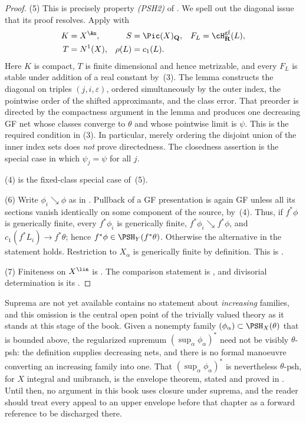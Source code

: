 \begin{proof}
(5) This is precisely property \emph{(PSH2)} of
\cite[Theorem~4.5]{BJ22}.  We spell out the diagonal issue that its proof
resolves.  Apply \cite[Lemma~4.6]{BJ22} with
\[
 \begin{aligned}
  K&=X^{\An},& S&=\Pic(X)_{\mathbf Q},
    &F_L&=\cH^{\mathrm{gf}}_{\mathbf R}(L),\\
  T&=N^1(X),& \rho(L)&=c_1(L).
 \end{aligned}
\]
Here \(K\) is compact, \(T\) is finite dimensional and hence metrizable,
and every \(F_L\) is stable under addition of a real constant by
\,(3).  The lemma constructs the diagonal on
triples \((j,i,\varepsilon)\), ordered simultaneously by the outer index,
the pointwise order of the shifted approximants, and the class error.  That
preorder is directed by the compactness argument in the lemma and produces
one decreasing GF net whose classes converge to \(\theta\) and whose
pointwise limit is \(\psi\).  This is the required condition in
(3).  In particular, merely ordering the disjoint union of
the inner index sets does \emph{not} prove directedness.  The closedness
assertion is the special case in which \(\psi_j=\psi\) for all \(j\).

(4) is the fixed-class special case of~(5).

(6) Write \(\phi_i\searrow\phi\) as in .  Pullback of a
GF presentation is again GF unless all its sections vanish identically on
some component of the source, by \,(4).  Thus,
if \(f^*\phi\) is generically finite, every \(f^*\phi_i\) is generically
finite, \(f^*\phi_i\searrow f^*\phi\), and
\(c_1(f^*L_i)\to f^*\theta\); hence
\(f^*\phi\in\PSH_Y(f^*\theta)\).  Otherwise the alternative in the
statement holds.  Restriction to \(X_\alpha\) is generically finite by
definition.  This is \cite[Theorem~4.7\,(iii)--(iv)]{BJ22}.

(7) Finiteness on \(X^{\lin}\) is
\cite[Corollary~4.17]{BJ22}.  The comparison statement is
\cite[Theorem~4.22]{BJ22}, and divisorial determination is its
\cite[Corollary~4.23]{BJ22}.
\end{proof}

\begin{warning}{Suprema are not yet available}
 contains no statement about \emph{increasing}
families, and this omission is the central open point of the trivially
valued theory as it stands at this stage of the book.  Given a nonempty
family \((\phi_\alpha)\subset\PSH_X(\theta)\) that is bounded above, the
regularized supremum \((\sup_\alpha\phi_\alpha)^*\) need not be visibly
\(\theta\)-psh: the definition supplies decreasing nets, and there is no
formal manoeuvre converting an increasing family into one.  That
\((\sup_\alpha\phi_\alpha)^*\) is nevertheless \(\theta\)-psh, for \(X\)
integral and unibranch, is the envelope theorem, stated and proved in
.  Until then, no argument in this book
uses closure under suprema, and the reader should treat every appeal to an
upper envelope before that chapter as a forward reference to be discharged
there.
\end{warning}

